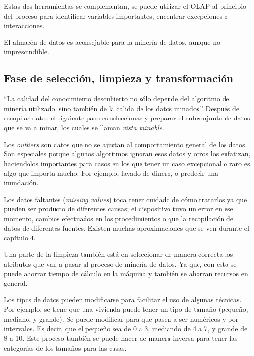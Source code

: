 \documentclass{article}
\begin{document}
Estas dos herramientas se complementan, se puede utilizar el OLAP al principio del proceso para identificar variables importantes, encontrar excepciones o interacciones.

El almacén de datos es aconsejable para la minería de datos, aunque no imprescindible.


\subsection{Fase de selección, limpieza y transformación}

``La calidad del conocimiento descubierto no sólo depende del algoritmo de minería utilizado, sino también de la calida de los datos minados.'' Después de recopilar datos el siguiente paso es seleccionar y preparar el subconjunto de datos que se va a minar, los cuales se llaman \textit{vista minable}.

Los \textit{outliers} son datos que no se ajustan al comportamiento general de los datos. Son especiales porque algunos algoritmos ignoran esos datos y otros los enfatizan, haciendolos importantes para casos en los que tener un caso excepcional o raro es algo que importa mucho. Por ejemplo, lavado de dinero, o predecir una inundación.

Los datos faltantes (\textit{missing values}) toca tener cuidado de cómo tratarlos ya que pueden ser producto de diferentes causas; el dispositivo tuvo un error en ese momento, cambios efectuados en los procedimientos o que la recopilación de datos de diferentes fuentes. Existen muchas aproximaciones que se ven durante el capítulo 4.

Una parte de la limpieza también está en seleccionar de manera correcta los atributos que van a pasar al proceso de minería de datos. Ya que, con esto se puede ahorrar tiempo de cálculo en la máquina y también se ahorran recursos en general.

Los tipos de datos pueden modificarse para facilitar el uso de algunas técnicas. Por ejemplo, se tiene que una vivienda puede tener un tipo de tamaño (pequeño, mediano, y grande). Se puede modificar para que pasen a ser numéricos y por intervalos. Es decir, que el pequeño sea de 0 a 3, mediando de 4 a 7, y grande de 8 a 10. Este proceso también se puede hacer de manera inversa para tener las categorías de los tamaños para las casas.
\end{document}
